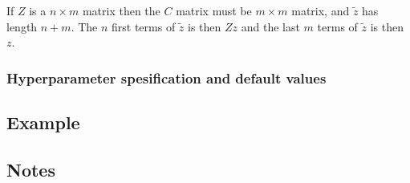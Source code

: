 \documentclass[a4paper,11pt]{article}
\begin{document}
If $Z$ is a $n\times m$ matrix then the $C$ matrix must be $m\times m$
matrix, and $\widetilde z$ has length $n+m$. The $n$ first terms of
$\widetilde z$ is then $Zz$ and the last $m$ terms of $\widetilde z$
is then $z$.

\subsubsection*{Hyperparameter spesification and default values}



\subsection*{Example}

\subsection*{Notes}
\end{document}
